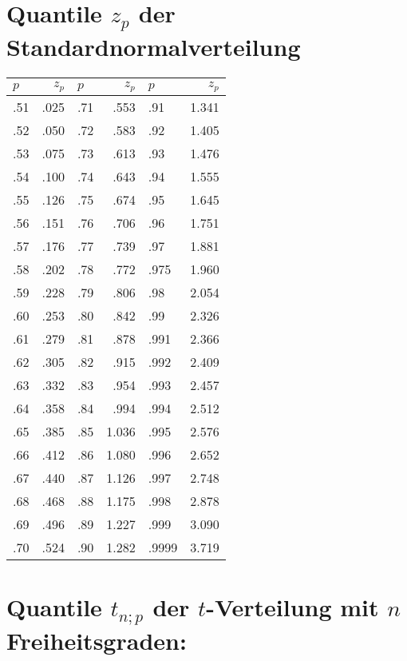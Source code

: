 \section{Quantile $z_p$ der Standardnormalverteilung}
\label{tbl:standardnormalverteilung_quantile}
\begin{tabular}{|lr|lr|lr|}
 $p$ & $z_p$ & $p$ & $z_p$ & $p$ & $z_p$ \\
\hline
.51 & .025 & .71 & .553 & .91 & 1.341 \\
.52 & .050 & .72 & .583 & .92 & 1.405 \\
.53 & .075 & .73 & .613 & .93 & 1.476 \\
.54 & .100 & .74 & .643 & .94 & 1.555 \\
.55 & .126 & .75 & .674 & .95 & 1.645 \\
\hline
.56 & .151 & .76 & .706 & .96 & 1.751 \\
.57 & .176 & .77 & .739 & .97 & 1.881 \\
.58 & .202 & .78 & .772 & .975 & 1.960 \\
.59 & .228 & .79 & .806 & .98 & 2.054 \\
.60 & .253 & .80 & .842 & .99 & 2.326 \\
\hline
.61 & .279 & .81 & .878 & .991 & 2.366 \\
.62 & .305 & .82 & .915 & .992 & 2.409 \\
.63 & .332 & .83 & .954 & .993 & 2.457 \\
.64 & .358 & .84 & .994 & .994 & 2.512 \\
.65 & .385 & .85 & 1.036 & .995 & 2.576 \\
\hline
.66 & .412 & .86 & 1.080 & .996 & 2.652 \\
.67 & .440 & .87 & 1.126 & .997 & 2.748 \\
.68 & .468 & .88 & 1.175 & .998 & 2.878 \\
.69 & .496 & .89 & 1.227 & .999 & 3.090 \\
.70 & .524 & .90 & 1.282 & .9999 & 3.719 \\
\hline
\end{tabular}
\newpage
\section{Quantile $t_{n;p}$ der $t$-Verteilung mit $n$ Freiheitsgraden:}
\label{sec:quantile_t_verteilung}

